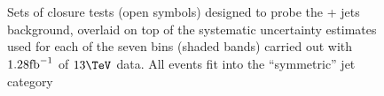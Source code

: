 \begin{figure}[h!]
  \begin{center}
     ~~
     \\
     ~~
     \\
    \caption{Sets of closure tests (open symbols) designed to probe
      the \znunu + jets background, overlaid on top of
      the systematic uncertainty estimates used for each of the seven
      \scalht bins (shaded bands) carried out with $1.28\text{fb}^{-1}$ of
      $13\tev$ data. All events fit into the ``symmetric'' jet
      category}
    \label{fig:ZinvclosureDataSym}
  \end{center} 
\end{figure}

